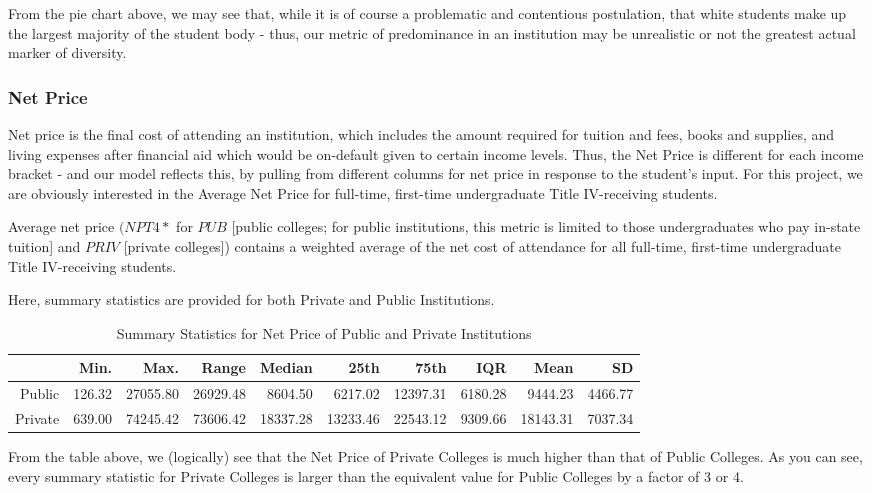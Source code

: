 \documentclass{article}\usepackage[]{graphicx}\usepackage[]{color}
\begin{document}
From the pie chart above, we may see that, while it is of course a problematic and contentious postulation, that white students make up the largest majority of the student body - thus, our metric of predominance in an institution may be unrealistic or not the greatest actual marker of diversity. 

\subsubsection{Net Price}
Net price is the final cost of attending an institution, which includes the amount required for tuition and fees, books and supplies, and living expenses after financial aid which would be on-default given to certain income levels. Thus, the Net Price is different for each income bracket - and our model reflects this, by pulling from different columns for net price in response to the student's input. For this project, we are obviously interested in the Average Net Price for full-time, first-time undergraduate Title IV-receiving students.\newline

Average net price $(NPT4 *$ for $PUB$ [public colleges; for public institutions, this metric is limited to those undergraduates who pay in-state tuition] and $PRIV$ [private colleges]) contains a weighted average of the net cost of attendance for all full-time, first-time undergraduate Title IV-receiving students.\newline

Here, summary statistics are provided for both Private and Public Institutions.\newline

\begin{table}[ht]
\centering
\begin{tabular}{rrrrrrrrrr}
  \hline
 & Min. & Max. & Range & Median & 25th & 75th & IQR & Mean & SD \\ 
  \hline
Public & 126.32 & 27055.80 & 26929.48 & 8604.50 & 6217.02 & 12397.31 & 6180.28 & 9444.23 & 4466.77 \\ 
  Private & 639.00 & 74245.42 & 73606.42 & 18337.28 & 13233.46 & 22543.12 & 9309.66 & 18143.31 & 7037.34 \\ 
   \hline
\end{tabular}
\caption{Summary Statistics for Net Price of Public and Private Institutions} 
\end{table}


From the table above, we (logically) see that the Net Price of Private Colleges is much higher than that of Public Colleges. As you can see, every summary statistic for Private Colleges is larger than the equivalent value for Public Colleges by a factor of 3 or 4.\newline
\end{document}

